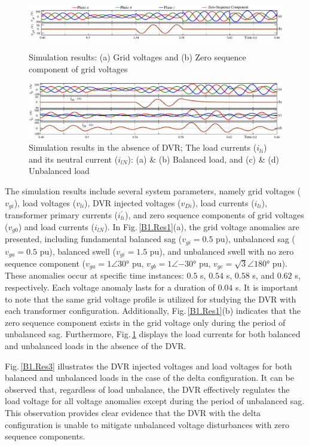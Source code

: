 \begin{figure}\centering
	\includegraphics[scale=0.8	]{figures/Appendix/Res1.pdf}
	\caption{Simulation results: (a) Grid voltages and (b) Zero sequence component of grid voltages} %
	\label{B1.Res1}
	\vspace*{1cm}
	\includegraphics[scale=0.8	]{figures/Appendix/Res2.pdf}
	\caption{Simulation results in the absence of DVR; The load currents ($i_{li}$) and its neutral current ($i_{lN}$): (a) \& (b) Balanced load, and (c) \& (d) Unbalanced load} %
	\label{B1.Res2}
\end{figure} 
The simulation results include several system parameters, namely grid voltages ($v_{gi}$), load voltages ($v_{li}$), DVR injected voltages ($v_{Di}$), load currents ($i_{li}$), transformer primary currents ($i^\prime_{li}$), and zero sequence components of grid voltages ($v_{g0}$) and load currents ($i_{lN}$). In Fig.\,\ref{B1.Res1}(a), the grid voltage anomalies are presented, including fundamental balanced sag ($v_{gi} = 0.5$ pu), unbalanced sag ($v_{ga} = 0.5$ pu), balanced swell ($v_{gi} = 1.5$ pu), and unbalanced swell with no zero sequence component ($v_{ga} = 1\angle\ang{30}$ pu, $v_{gb} = 1\angle\ang{-30}$ pu, $v_{gc} = \sqrt{3}\angle\ang{180}$ pu). These anomalies occur at specific time instances: $0.5$ s, $0.54$ s, $0.58$ s, and $0.62$ s, respectively. Each voltage anomaly lasts for a duration of $0.04$ s. It is important to note that the same grid voltage profile is utilized for studying the DVR with each transformer configuration. Additionally, Fig.\,\ref{B1.Res1}(b) indicates that the zero sequence component exists in the grid voltage only during the period of unbalanced sag. Furthermore, Fig.\,\ref{B1.Res2} displays the load currents for both balanced and unbalanced loads in the absence of the DVR.

Fig.\,\ref{B1.Res3} illustrates the DVR injected voltages and load voltages for both balanced and unbalanced loads in the case of the delta configuration. It can be observed that, regardless of load unbalance, the DVR effectively regulates the load voltage for all voltage anomalies except during the period of unbalanced sag. This observation provides clear evidence that the DVR with the delta configuration is unable to mitigate unbalanced voltage disturbances with zero sequence components.
 
